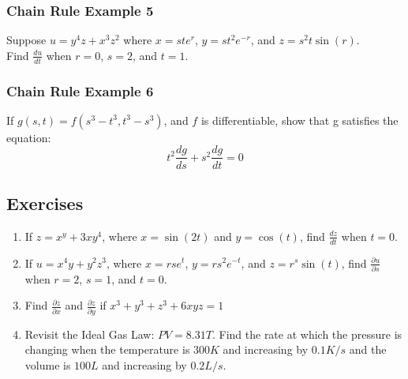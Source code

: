 \documentclass[12pt]{article}
\begin{document}
\subsubsection{Chain Rule Example 5}
Suppose \(u=y^4z + x^3z^2\) where \(x=ste^r\), \(y = st^2e^{-r}\), and \(z=s^2t\sin(r)\). \\
Find \(\frac{du}{dt}\) when \(r=0\), \(s=2\), and \(t=1\).

\subsubsection{Chain Rule Example 6}
If \(g(s,t) = f(s^3 - t^3, t^3 - s^3)\), and \(f\) is differentiable, show that g satisfies the equation:
\[
	t^2 \frac{dg}{ds} + s^2 \frac{dg}{dt} = 0
\]

\subsection{Exercises}
\begin{enumerate}
	\item If \(z=x^y + 3xy^4\), where \(x= \sin(2t)\) and \(y=\cos(t)\), find \(\frac{dz}{dt}\) when \(t=0\).
	\item If \(u = x^4y + y^2z^3\), where \(x=rse^t\), \(y=rs^2e^{-t}\), and \(z=r^s\sin(t)\), find \(\frac{\partial u}{\partial s} \) when \(r = 2\), \(s = 1\), and \(t= 0\).
	\item Find \(\frac{\partial z}{\partial x}\) and \(\frac{\partial z}{\partial y}\) if \(x^3 + y^3 + z^3 + 6xyz = 1\)
	\item Revisit the Ideal Gas Law: \(PV = 8.31T\). Find the rate at which the pressure is changing when the temperature is \(300K\) and increasing by \(0.1K/s\) and the volume is \(100L\) and increasing by \(0.2L/s\).
\end{enumerate}
\end{document}
